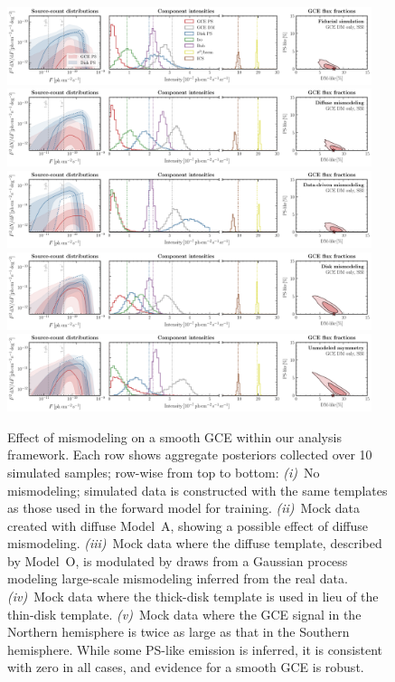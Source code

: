 \documentclass[prd,aps,10pt,nofootinbib,twocolumn,superscriptaddress,preprintnumbers,balancelastpage,longbibliography,floatfix]{revtex4-2}
\begin{document}
%
\begin{figure}[!htbp]
\centering
\includegraphics[width=0.95\textwidth]{sim_sbi_dm_agg.pdf}
\includegraphics[width=0.95\textwidth]{sim_sbi_modelA_dm.pdf}
\includegraphics[width=0.95\textwidth]{sim_sbi_dm_mismo.pdf}
\includegraphics[width=0.95\textwidth]{sim_sbi_thick_disk_mm_dm.pdf}
\includegraphics[width=0.95\textwidth]{sim_sbi_dm_asym.pdf}
\caption{Effect of mismodeling on a smooth GCE within our analysis framework. Each row shows aggregate posteriors collected over 10 simulated samples; row-wise from top to bottom: \emph{(i)}~No mismodeling; simulated data is constructed with the same templates as those used in the forward model for training. \emph{(ii)}~Mock data created with diffuse {Model~A}, showing a possible effect of diffuse mismodeling. \emph{(iii)}~Mock data where the diffuse template, described by {Model~O}, is modulated by draws from a Gaussian process modeling large-scale mismodeling inferred from the real \Fermi data. \emph{(iv)}~Mock data where the thick-disk template is used in lieu of the thin-disk template. \emph{(v)}~Mock data where the GCE signal in the Northern hemisphere is twice as large as that in the Southern hemisphere. While some PS-like emission is inferred, it is consistent with zero in all cases, and evidence for a smooth GCE is robust.}
\label{fig:sim_sbi_mismo}
\end{figure}
%
\end{document}
